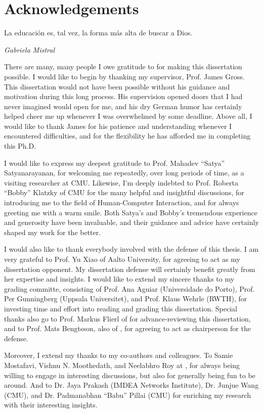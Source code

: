 \chapter{Acknowledgements}
\epigraph{La educación es, tal vez, la forma más alta de buscar a Dios.}{\emph{Gabriela Mistral}}
\glsresetall%

There are many, many people I owe gratitude to for making this dissertation possible.
I would like to begin by thanking my supervisor, Prof. James Gross.
This dissertation would not have been possible without his guidance and motivation during this long process.
His supervision opened doors that I had never imagined would open for me, and his dry German humor has certainly helped cheer me up whenever I was overwhelmed by some deadline.
Above all, I would like to thank James for his patience and understanding whenever I encountered difficulties, and for the flexibility he has afforded me in completing this Ph.D.

I would like to express my deepest gratitude to Prof. Mahadev ``Satya'' Satyanarayanan, for welcoming me repeatedly, over long periods of time, as a visiting researcher at \gls{CMU}.
Likewise, I'm deeply indebted to Prof. Roberta ``Bobby'' Klatzky of \gls{CMU} for the many helpful and insightful discussions, for introducing me to the field of Human-Computer Interaction, and for always greeting me with a warm smile.
Both Satya's and Bobby's tremendous experience and generosity have been invaluable, and their guidance and advice have certainly shaped my work for the better.

I would also like to thank everybody involved with the defense of this thesis.
I am very grateful to Prof. Yu Xiao of Aalto University, for agreeing to act as my dissertation opponent.
My dissertation defense will certainly benefit greatly from her expertise and insights.
I would like to extend my sincere thanks to my grading committe, consisting of Prof. Ana Aguiar (Universidade do Porto), Prof. Per Gunningberg (Uppsala Universitet), and Prof. Klaus Wehrle (\gls{RWTH}), for investing time and effort into reading and grading this dissertation.
Special thanks also go to Prof. Markus Flierl of  for advance-reviewing this dissertation, and to Prof. Mats Bengtsson, also of , for agreeing to act as chairperson for the defense.

Moreover, I extend my thanks to my co-authors and colleagues.
To Samie Mostafavi, Vishnu N. Moothedath, and Neelabhro Roy at , for always being willing to engage in interesting discussions, but also for generally being fun to be around.
And to Dr. Jaya Prakash (IMDEA Networks Institute), Dr. Junjue Wang (\gls{CMU}), and Dr. Padmanabhan ``Babu'' Pillai (\gls{CMU}) for enriching my research with their interesting insights.

